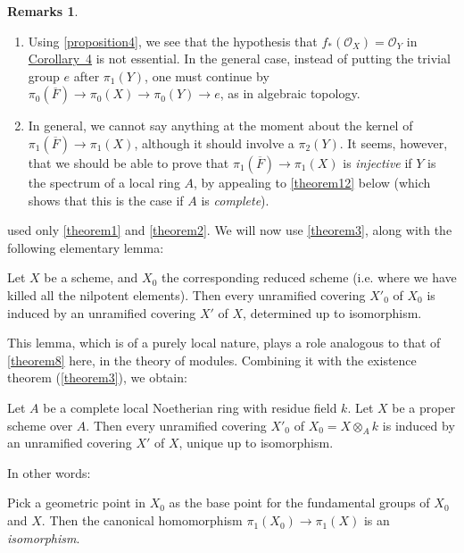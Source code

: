 \documentclass{article}
\theoremstyle{plain}
\newenvironment{theorem}[1]
  {\renewcommand\theinnercustomtheorem{#1}\innercustomtheorem}
  {\endinnercustomtheorem}
\newenvironment{lemma}[1]
  {\renewcommand\theinnercustomlemma{#1}\innercustomlemma}
  {\endinnercustomlemma}
\newenvironment{corollary}[1]
  {\renewcommand\theinnercustomcorollary{#1}\innercustomcorollary}
  {\endinnercustomcorollary}
\theoremstyle{definition}
\newtheorem*{remarks}{Remarks}
\newcommand{\sh}{\mathscr}
\newcommand{\oldpage}[1]{\marginpar{\footnotesize$\Big\vert$ \textit{p.~#1}}}
\begin{document}
\begin{remarks}
  \begin{enumerate}[1)]
    \item Using \cref{proposition4}, we see that the hypothesis that $f_*(\sh{O}_X)=\sh{O}_Y$ in \hyperref[theorem11corollary4]{Corollary~4} is not essential.
      In the general case, instead of putting the trivial group $e$ after $\pi_1(Y)$, one must continue by $\pi_0(\overline{F})\to\pi_0(X)\to\pi_0(Y)\to e$,
\oldpage{182-24}
      as in algebraic topology.
    \item In general, we cannot say anything at the moment about the kernel of $\pi_1(\overline{F})\to\pi_1(X)$, although it should involve a $\pi_2(Y)$.
      It seems, however, that we should be able to prove that $\pi_1(\overline{F})\to\pi_1(X)$ is \emph{injective} if $Y$ is the spectrum of a local ring $A$, by appealing to \cref{theorem12} below (which shows that this is the case if $A$ is \emph{complete}).
  \end{enumerate}
\end{remarks}

 used only \cref{theorem1} and \cref{theorem2}.
We will now use \cref{theorem3}, along with the following elementary lemma:

\begin{lemma}{6}
\label{lemma6}
  Let $X$ be a scheme, and $X_0$ the corresponding reduced scheme (i.e. where we have killed all the nilpotent elements).
  Then every unramified covering $X'_0$ of $X_0$ is induced by an unramified covering $X'$ of $X$, determined up to isomorphism.
\end{lemma}

This lemma, which is of a purely local nature, plays a role analogous to that of \cref{theorem8} here, in the theory of modules.
Combining it with the existence theorem (\cref{theorem3}), we obtain:

\begin{theorem}{12}
\label{theorem12}
  Let $A$ be a complete local Noetherian ring with residue field $k$.
  Let $X$ be a proper scheme over $A$.
  Then every unramified covering $X'_0$ of $X_0=X\otimes_Ak$ is induced by an unramified covering $X'$ of $X$, unique up to isomorphism.
\end{theorem}

In other words:

\begin{corollary}{1}
\label{theorem12corollary1}
  Pick a geometric point in $X_0$ as the base point for the fundamental groups of $X_0$ and $X$.
  Then the canonical homomorphism $\pi_1(X_0)\to\pi_1(X)$ is an \emph{isomorphism}.
\end{corollary}
\end{document}
